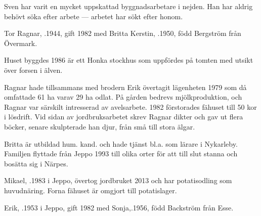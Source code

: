 Sven har varit en mycket uppskattad byggnadsarbetare i nejden. Han har aldrig behövt söka efter arbete --- arbetet har sökt efter honom.



Tor Ragnar, .1944, gift 1982 med Britta Kerstin, .1950, född Bergström från Övermark.
\begin{jhchildren}
  \item {}
  \item {}
\end{jhchildren}
Huset byggdes 1986 är ett Honka stockhus som uppfördes på tomten med utsikt över forsen i älven.

Ragnar hade tillsammans med brodern Erik övertagit lägenheten 1979 som då omfattade 61 ha varav 29 ha odlat. På gården bedrevs mjölkproduktion, och Ragnar var särskilt intresserad av avelsarbete. 1982 förstorades fähuset till 50 kor i lösdrift. Vid sidan av jordbruksarbetet skrev Ragnar dikter och gav ut flera böcker, senare skulpterade han djur, från små till stora älgar.

Britta är utbildad hum. kand. och hade tjänst bl.a. som lärare i Nykarleby. Familjen flyttade från Jeppo 1993 till olika orter för att till slut stanna och bosätta sig i Närpes.





Mikael, .1983 i Jeppo, övertog jordbruket 2013 och har potatisodling som huvudnäring. Forna fähuset är omgjort till potatislager.\jhvspace{}



Erik, .1953 i Jeppo, gift 1982 med Sonja,.1956, född Backström från Esse.
\begin{jhchildren}
  \item {}
  \item {}
  \item {}
  \item {}
  \item {}
  \item {}
  \item {}
\end{jhchildren}

